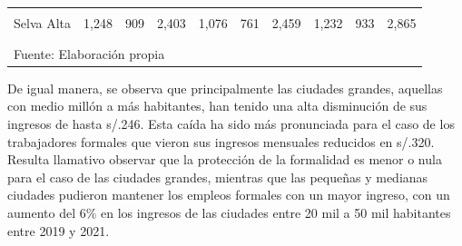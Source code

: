 \documentclass[
  letterpaper,
  12pt,
  oneside,
  spanish,
  doublespacing,
  headsepline,
  parskip]{MastersDoctoralThesis}
\begin{document}
\begin{table}[H]
\begin{tabular}{cccccccccc}
\cellcolor{gray!6}{Selva Baja} & \cellcolor{gray!6}{1,343} & \cellcolor{gray!6}{909} & \cellcolor{gray!6}{2,476} & \cellcolor{gray!6}{1,205} & \cellcolor{gray!6}{870} & \cellcolor{gray!6}{2,400} & \cellcolor{gray!6}{1,327} & \cellcolor{gray!6}{999} & \cellcolor{gray!6}{2,731}\\
Selva Alta & 1,248 & 909 & 2,403 & 1,076 & 761 & 2,459 & 1,232 & 933 & 2,865\\
\addlinespace
\cellcolor{gray!6}{Lima Metropolitana} & \cellcolor{gray!6}{1,910} & \cellcolor{gray!6}{1,206} & \cellcolor{gray!6}{2,847} & \cellcolor{gray!6}{1,671} & \cellcolor{gray!6}{1,041} & \cellcolor{gray!6}{2,491} & \cellcolor{gray!6}{1,643} & \cellcolor{gray!6}{1,098} & \cellcolor{gray!6}{2,488}\\
\bottomrule
\multicolumn{10}{l}{\textsuperscript{} Fuente: Elaboración propia}\\
\end{tabular}
\endgroup{}
\end{table}

De igual manera, se observa que principalmente las ciudades grandes,
aquellas con medio millón a más habitantes, han tenido una alta
disminución de sus ingresos de hasta s/.246. Esta caída ha sido más
pronunciada para el caso de los trabajadores formales que vieron sus
ingresos mensuales reducidos en s/.320. Resulta llamativo observar que
la protección de la formalidad es menor o nula para el caso de las
ciudades grandes, mientras que las pequeñas y medianas ciudades pudieron
mantener los empleos formales con un mayor ingreso, con un aumento del
6\% en los ingresos de las ciudades entre 20 mil a 50 mil habitantes
entre 2019 y 2021.
\end{document}
